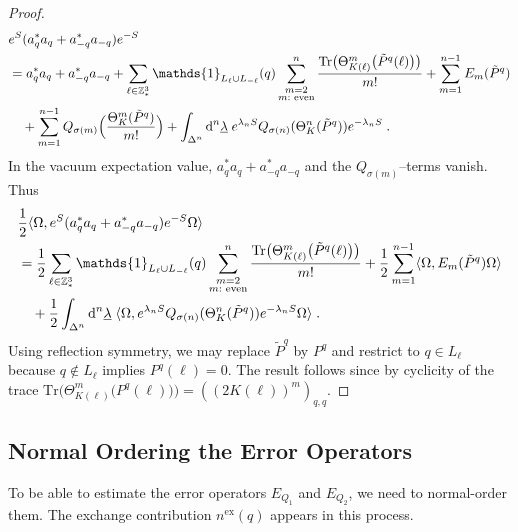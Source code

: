 \documentclass[12pt,a4paper]{article}
\numberwithin{equation}{section}
\newcommand{\1}{\mathbb{I}}
\newcommand{\di}{\textnormal{d}}
\newcommand{\ex}{\mathrm{ex}}
\newcommand{\Z}{\mathbb{Z}}
\newcommand{\half}{\frac{1}{2}}
\theoremstyle{plain}
\theoremstyle{definition}
\theoremstyle{remark}
\theoremstyle{plain}
\theoremstyle{definition}
\theoremstyle{remark}
\begin{document}
\begin{proof}
\begin{equation}
\begin{aligned}
	&e^{S} (a_q^* a_q + a_{-q}^* a_{-q}) e^{-S} \\
	&= a_q^* a_q + a_{-q}^* a_{-q}
		+ \sum_{\ell\in \Z^3_*} \mathds{1}_{L_\ell \cup L_{-\ell}}(q) \sum_{\substack{m=2\\m:\textnormal{ even}}}^n \frac{\mathrm{Tr} \big(\Theta^m_{K(\ell)} \big( \tilde{P}^q(\ell) \big) \big)}{m!}
		+ \sum_{m=1}^{n-1} E_m(\tilde{P}^q) \\
	&\quad+ \sum_{m=1}^{n-1}
		Q_{\sigma(m)} \Big( \frac{\Theta^m_{K}(\tilde{P}^q)}{m!} \Big)
		+\int_{\Delta^n} \di^n \underline{\lambda} \;
		e^{\lambda_n S}Q_{\sigma(n)}(\Theta^n_K (\tilde{P}^q)) e^{-\lambda_n S} \;.
\end{aligned}
\end{equation}
In the vacuum expectation value, $ a_q^* a_q + a_{-q}^* a_{-q} $ and the $ Q_{\sigma(m)} $--terms vanish. Thus
\begin{equation}
\begin{aligned}
	& \half \langle \Omega, e^{S} (a_q^* a_q + a_{-q}^* a_{-q}) e^{-S} \Omega \rangle \\
	&= \half \sum_{\ell\in \Z^3_*} \mathds{1}_{L_\ell \cup L_{-\ell}}(q) \sum_{\substack{m=2\\m:\textnormal{ even}}}^n \frac{\mathrm{Tr} \big(\Theta^m_{K(\ell)} \big( \tilde{P}^q(\ell) \big) \big)}{m!}
	+ \half \sum_{m=1}^{n-1} \langle \Omega, E_m(\tilde{P}^q) \Omega \rangle \\
	&\quad + \half \int_{\Delta^n} \di^n \underline{\lambda} \;
		\langle \Omega, e^{\lambda_n S}Q_{\sigma(n)}(\Theta^n_{K}(\tilde{P}^q)) e^{-\lambda_n S} \Omega \rangle \;.
\end{aligned}
\end{equation}
Using reflection symmetry, we may replace $ \tilde{P}^q $ by $ P^q $ and restrict to $ q \in L_\ell $ because $ q \notin L_\ell$ implies $P^q(\ell) = 0 $. The result follows since by cyclicity of the trace $ \mathrm{Tr} \big(\Theta^m_{K(\ell)} \big( P^q(\ell) \big) \big) = ((2K(\ell))^m)_{q,q} $.
\end{proof}






\subsection{Normal Ordering the Error Operators}
\label{sec:extraction_ex}

To be able to estimate the error operators $ E_{Q_1} $ and $ E_{Q_2} $, we need to normal-order them. The exchange contribution $ n^{\ex}(q) $ appears in this process.
\end{document}
